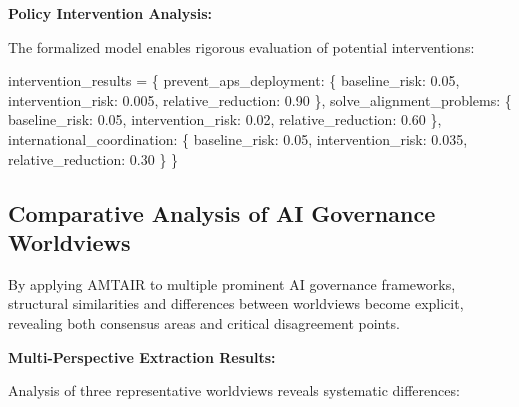 \documentclass[
  11pt,
  letterpaper,
]{book}
\newenvironment{Shaded}{\begin{snugshade}}{\end{snugshade}}
\newcommand{\FloatTok}[1]{\textcolor[rgb]{0.68,0.00,0.00}{#1}}
\newcommand{\NormalTok}[1]{\textcolor[rgb]{0.00,0.23,0.31}{#1}}
\newcommand{\OperatorTok}[1]{\textcolor[rgb]{0.37,0.37,0.37}{#1}}
\newcommand{\StringTok}[1]{\textcolor[rgb]{0.13,0.47,0.30}{#1}}
\begin{document}
\textbf{Policy Intervention Analysis:}

The formalized model enables rigorous evaluation of potential
interventions:

\begin{Shaded}
\begin{Highlighting}[]
\NormalTok{intervention\_results }\OperatorTok{=}\NormalTok{ \{}
    \StringTok{\textquotesingle{}prevent\_aps\_deployment\textquotesingle{}}\NormalTok{: \{}
        \StringTok{\textquotesingle{}baseline\_risk\textquotesingle{}}\NormalTok{: }\FloatTok{0.05}\NormalTok{,}
        \StringTok{\textquotesingle{}intervention\_risk\textquotesingle{}}\NormalTok{: }\FloatTok{0.005}\NormalTok{,}
        \StringTok{\textquotesingle{}relative\_reduction\textquotesingle{}}\NormalTok{: }\FloatTok{0.90}
\NormalTok{    \},}
    \StringTok{\textquotesingle{}solve\_alignment\_problems\textquotesingle{}}\NormalTok{: \{}
        \StringTok{\textquotesingle{}baseline\_risk\textquotesingle{}}\NormalTok{: }\FloatTok{0.05}\NormalTok{,  }
        \StringTok{\textquotesingle{}intervention\_risk\textquotesingle{}}\NormalTok{: }\FloatTok{0.02}\NormalTok{,}
        \StringTok{\textquotesingle{}relative\_reduction\textquotesingle{}}\NormalTok{: }\FloatTok{0.60}
\NormalTok{    \},}
    \StringTok{\textquotesingle{}international\_coordination\textquotesingle{}}\NormalTok{: \{}
        \StringTok{\textquotesingle{}baseline\_risk\textquotesingle{}}\NormalTok{: }\FloatTok{0.05}\NormalTok{,}
        \StringTok{\textquotesingle{}intervention\_risk\textquotesingle{}}\NormalTok{: }\FloatTok{0.035}\NormalTok{,  }
        \StringTok{\textquotesingle{}relative\_reduction\textquotesingle{}}\NormalTok{: }\FloatTok{0.30}
\NormalTok{    \}}
\NormalTok{\}}
\end{Highlighting}
\end{Shaded}

\subsection{Comparative Analysis of AI Governance
Worldviews}\label{sec-comparative-analysis}

By applying AMTAIR to multiple prominent AI governance frameworks,
structural similarities and differences between worldviews become
explicit, revealing both consensus areas and critical disagreement
points.

\textbf{Multi-Perspective Extraction Results:}

Analysis of three representative worldviews reveals systematic
differences:
\end{document}
